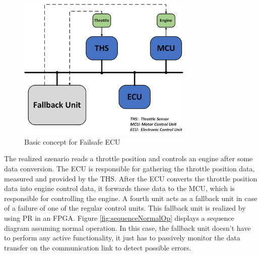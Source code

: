 \begin{figure}[h!]
    \centering
    \includegraphics[width=0.75\textwidth]{figures/basic_design.png}
    \caption{Basic concept for Failsafe ECU}\label{fig:basicDesign}
\end{figure}

The realized szenario reads a throttle position and controls an engine after some data conversion. The \gls{ECU} is responsible for gathering the throttle position data, measured and provided by the \gls{THS}. After the \gls{ECU} converts the throttle position data into engine control data, it forwards these data to the \gls{MCU}, which is responsible for controlling the engine. A fourth unit acts as a fallback unit in case of a failure of one of the regular control units. This fallback unit is realized by using \gls{PR} in an \gls{FPGA}. Figure \ref{fig:sequenceNormalOp} displays a sequence diagram assuming normal operation. In this case, the fallback unit doesn't have to perform any active functionality, it just has to passively monitor the data transfer on the communication link to detect possible errors.

